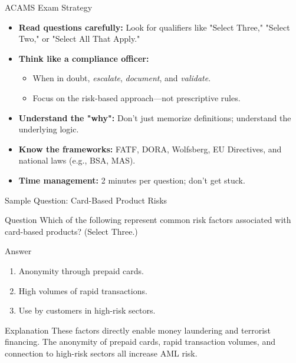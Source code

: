\documentclass{beamer}
\begin{document}
	\begin{frame}{ACAMS Exam Strategy}
		\begin{itemize}
			\item \textbf{Read questions carefully:} Look for qualifiers like "Select Three," "Select Two," or "Select All That Apply."
			\item \textbf{Think like a compliance officer:}
			\begin{itemize}
				\item When in doubt, \textit{escalate}, \textit{document}, and \textit{validate}.
				\item Focus on the risk-based approach—not prescriptive rules.
			\end{itemize}
			\item \textbf{Understand the "why":} Don't just memorize definitions; understand the underlying logic.
			\item \textbf{Know the frameworks:} FATF, DORA, Wolfsberg, EU Directives, and national laws (e.g., BSA, MAS).
			\item \textbf{Time management:} 2 minutes per question; don't get stuck.
		\end{itemize}
	\end{frame}
	
	\begin{frame}{Sample Question: Card-Based Product Risks}
		\begin{block}{Question}
			Which of the following represent common risk factors associated with card-based products? (Select Three.)
		\end{block}
		\begin{block}{Answer}
			\begin{enumerate}
				\item Anonymity through prepaid cards.
				\item High volumes of rapid transactions.
				\item Use by customers in high-risk sectors.
			\end{enumerate}
		\end{block}
		\begin{alertblock}{Explanation}
			These factors directly enable money laundering and terrorist financing. The anonymity of prepaid cards, rapid transaction volumes, and connection to high-risk sectors all increase AML risk.
		\end{alertblock}
	\end{frame}
	
\end{document}
